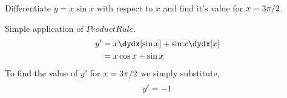 

\question[2] Differentiate $y=x\sin x$ with respect to $x$ and 
find it's value for $x=3\pi/2$.

\insertQR{}

\watchout

\begin{solution}[\mcq]
  Simple application of $Product Rule$.
  \begin{align}
    y' &= x \dydx[\sin x] + \sin x\dydx[x] \\
       &= x\cos x + \sin x
  \end{align}
  To find the value of $y'$ for $x=3\pi/2$ we simply substitute,
  \begin{align}
    y'= -1
  \end{align}
\end{solution}

